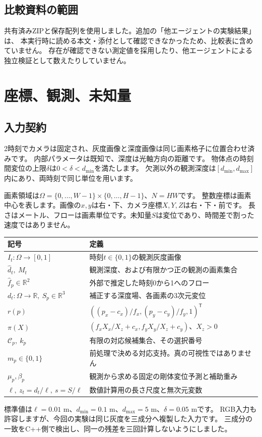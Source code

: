 \documentclass[a4paper,11pt]{ltjsarticle}
\newcommand{\R}{\mathbb R}\newcommand{\T}{\mathsf T}\newcommand{\norm}[1]{\left\lVert#1\right\rVert}
\theoremstyle{definition}
\begin{document}
\subsection{比較資料の範囲}
共有済みZIPと保存配列を使用しました。追加の「他エージェントの実験結果」は、
本実行時に読める本文・添付として確認できなかったため、比較表に含めていません。
存在が確認できない測定値を採用したり、他エージェントによる独立検証として数えたりしていません。

\section{座標、観測、未知量}
\subsection{入力契約}
\begin{assumption}[標準設定の適用域]\label{ass:domain}
2時刻でカメラは固定され、灰度画像と深度画像は同じ画素格子に位置合わせ済みです。
内部パラメータは既知で、深度は光軸方向の距離です。
物体点の時刻間変位の上限$\delta$は$0<\delta<d_{\min}$を満たします。
欠測以外の観測深度は$[d_{\min},d_{\max}]$内にあり、両時刻で同じ単位を用います。
\end{assumption}
画素領域は$\Omega=\{0,\ldots,W-1\}\times\{0,\ldots,H-1\}$、$N=HW$です。
整数座標は画素中心を表します。画像の$x,y$は右・下、カメラ座標$X,Y,Z$は右・下・前です。
長さはメートル、フローは画素単位です。未知量$S$は変位であり、時間差で割った速度ではありません。
\begin{center}\small
\begin{tabularx}{\linewidth}{lX}\toprule 記号 & 定義\\\midrule
$I_t:\Omega\to[0,1]$ & 時刻$t\in\{0,1\}$の観測灰度画像\\
$\widehat d_t,\ M_t$ & 観測深度、および有限かつ正の観測の画素集合\\
$\widehat f_p\in\R^2$ & 外部で推定した時刻0から1へのフロー\\
$d_t:\Omega\to\R,\ S_p\in\R^3$ & 補正する深度場、各画素の3次元変位\\
$r(p)$ & $((p_x-c_x)/f_x,(p_y-c_y)/f_y,1)^\T$\\
$\pi(X)$ & $(f_xX_x/X_z+c_x,f_yX_y/X_z+c_y)$、$X_z>0$\\
$\mathcal C_p,\ k_p$ & 有限の対応候補集合、その選択番号\\
$m_p\in\{0,1\}$ & 前処理で決める対応支持。真の可視性ではありません\\
$\mu_p,\beta_p$ & 観測から求める固定の剛体変位予測と補助重み\\
$\ell,\ z_t=d_t/\ell,\ s=S/\ell$ & 数値計算用の長さ尺度と無次元変数\\\bottomrule
\end{tabularx}\end{center}
標準値は$\ell=0.01$ m、$d_{\min}=0.1$ m、$d_{\max}=5$ m、$\delta=0.05$ mです。
RGB入力も許容しますが、今回の実験は同じ灰度を三成分へ複製した入力です。
三成分の一致をC++側で検出し、同一の残差を三回計算しないようにしました。
\end{document}
